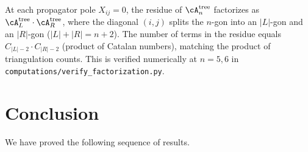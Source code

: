 \begin{remark}
\label{rmk:factorization}
At each propagator pole $X_{ij} = 0$, the residue of
$\cA_n^{\mathrm{tree}}$ factorizes as
$\cA_L^{\mathrm{tree}} \cdot \cA_R^{\mathrm{tree}}$,
where the diagonal $(i,j)$ splits the $n$-gon into an
$|L|$-gon and an $|R|$-gon ($|L| + |R| = n + 2$).
The number of terms in the residue equals
$C_{|L|-2} \cdot C_{|R|-2}$ (product of Catalan numbers),
matching the product of triangulation counts.
This is verified numerically at $n = 5, 6$ in
\texttt{computations/verify\_factorization.py}.
\end{remark}

\section{Conclusion}
\label{sec:conclusion}

We have proved the following sequence of results.

